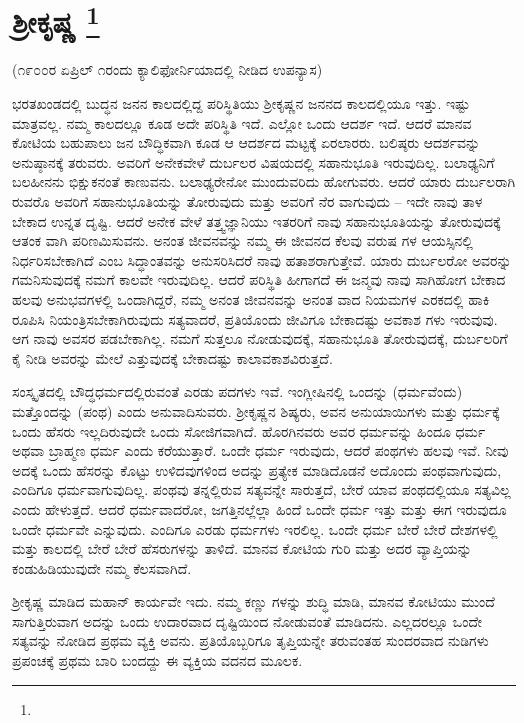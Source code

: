 
\chapter[ಶ‍್ರೀಕೃಷ್ಣ ]{ಶ‍್ರೀಕೃಷ್ಣ \protect\footnote{}}

\centerline{(೧೯೦೦ರ ಏಪ್ರಿಲ್​ ೧ರಂದು ಕ್ಯಾಲಿಫೋರ್ನಿಯಾದಲ್ಲಿ ನೀಡಿದ ಉಪನ್ಯಾಸ)}

ಭರತಖಂಡದಲ್ಲಿ ಬುದ್ಧನ ಜನನ ಕಾಲದಲ್ಲಿದ್ದ ಪರಿಸ್ಥಿತಿಯು ಶ‍್ರೀಕೃಷ್ಣನ ಜನನದ ಕಾಲದಲ್ಲಿಯೂ ಇತ್ತು. ಇಷ್ಟು ಮಾತ್ರವಲ್ಲ. ನಮ್ಮ ಕಾಲದಲ್ಲೂ ಕೂಡ ಅದೇ ಪರಿಸ್ಥಿತಿ ಇದೆ. ಎಲ್ಲೋ ಒಂದು ಆದರ್ಶ ಇದೆ. ಆದರೆ ಮಾನವ ಕೋಟಿಯ ಬಹುಪಾಲು ಜನ ಬೌದ್ಧಿಕವಾಗಿ ಕೂಡ ಆ ಆದರ್ಶದ ಮಟ್ಟಕ್ಕೆ ಏರಲಾರರು. ಬಲಿಷ್ಠರು ಆದರ್ಶವನ್ನು ಅನುಷ್ಠಾನಕ್ಕೆ ತರುವರು. ಅವರಿಗೆ ಅನೇಕವೇಳೆ ದುರ್ಬಲರ ವಿಷಯದಲ್ಲಿ ಸಹಾನುಭೂತಿ ಇರುವುದಿಲ್ಲ. ಬಲಾಢ್ಯನಿಗೆ ಬಲಹೀನನು ಭಿಕ್ಷುಕನಂತೆ ಕಾಣುವನು. ಬಲಾಢ್ಯರೇನೋ ಮುಂದುವರಿದು ಹೋಗುವರು. ಆದರೆ ಯಾರು ದುರ್ಬಲರಾಗಿ ರುವರೊ ಅವರಿಗೆ ಸಹಾನುಭೂತಿಯನ್ನು ತೋರುವುದು ಮತ್ತು ಅವರಿಗೆ ನೆರ ವಾಗುವುದು – ಇದೇ ನಾವು ತಾಳ ಬೇಕಾದ ಉನ್ನತ ದೃಷ್ಟಿ. ಆದರೆ ಅನೇಕ ವೇಳೆ ತತ್ತ್ವಜ್ಞಾನಿಯು ಇತರರಿಗೆ ನಾವು ಸಹಾನುಭೂತಿಯನ್ನು ತೋರುವುದಕ್ಕೆ ಆತಂಕ ವಾಗಿ ಪರಿಣಮಿಸುವನು. ಅನಂತ ಜೀವನವನ್ನು ನಮ್ಮ ಈ ಜೀವನದ ಕೆಲವು ವರುಷ ಗಳ ಆಯಸ್ಸಿನಲ್ಲಿ ನಿರ್ಧರಿಸಬೇಕಾಗಿದೆ ಎಂಬ ಸಿದ್ಧಾಂತವನ್ನು ಅನುಸರಿಸಿದರೆ ನಾವು ಹತಾಶರಾಗುತ್ತೇವೆ. ಯಾರು ದುರ್ಬಲರೋ ಅವರನ್ನು ಗಮನಿಸುವುದಕ್ಕೆ ನಮಗೆ ಕಾಲವೇ ಇರುವುದಿಲ್ಲ. ಆದರೆ ಪರಿಸ್ಥಿತಿ ಹೀಗಾಗದೆ ಈ ಜನ್ಮವು ನಾವು ಸಾಗಿಹೋಗ ಬೇಕಾದ ಹಲವು ಅನುಭವಗಳಲ್ಲಿ ಒಂದಾಗಿದ್ದರೆ, ನಮ್ಮ ಅನಂತ ಜೀವನವನ್ನು ಅನಂತ ವಾದ ನಿಯಮಗಳ ಎರಕದಲ್ಲಿ ಹಾಕಿ ರೂಪಿಸಿ ನಿಯಂತ್ರಿಸಬೇಕಾಗಿರುವುದು ಸತ್ಯವಾದರೆ, ಪ್ರತಿಯೊಂದು ಜೀವಿಗೂ ಬೇಕಾದಷ್ಟು ಅವಕಾಶ ಗಳು ಇರುವುವು. ಆಗ ನಾವು ಅವಸರ ಪಡಬೇಕಾಗಿಲ್ಲ. ನಮಗೆ ಸುತ್ತಲೂ ನೋಡುವುದಕ್ಕೆ, ಸಹಾನುಭೂತಿ ತೋರುವುದಕ್ಕೆ, ದುರ್ಬಲರಿಗೆ ಕೈ ನೀಡಿ ಅವರನ್ನು ಮೇಲೆ ಎತ್ತುವುದಕ್ಕೆ ಬೇಕಾದಷ್ಟು ಕಾಲಾವಕಾಶವಿರುತ್ತದೆ.

ಸಂಸ್ಕೃತದಲ್ಲಿ ಬೌದ್ಧಧರ್ಮದಲ್ಲಿರುವಂತೆ ಎರಡು ಪದಗಳು ಇವೆ. ಇಂಗ್ಲೀಷಿನಲ್ಲಿ ಒಂದನ್ನು  (ಧರ್ಮವೆಂದು) ಮತ್ತೊಂದನ್ನು  (ಪಂಥ) ಎಂದು ಅನುವಾದಿಸುವರು. ಶ‍್ರೀಕೃಷ್ಣನ ಶಿಷ್ಯರು, ಅವನ ಅನುಯಾಯಿಗಳು ಮತ್ತು ಧರ್ಮಕ್ಕೆ ಒಂದು ಹೆಸರು ಇಲ್ಲದಿರುವುದೇ ಒಂದು ಸೋಜಿಗವಾಗಿದೆ. ಹೊರಗಿನವರು ಅವರ ಧರ್ಮವನ್ನು ಹಿಂದೂ ಧರ್ಮ ಅಥವಾ ಬ್ರಾಹ್ಮಣ ಧರ್ಮ ಎಂದು ಕರೆಯುತ್ತಾರೆ. ಒಂದೇ ಧರ್ಮ ಇರುವುದು, ಆದರೆ ಪಂಥಗಳು ಹಲವು ಇವೆ. ನೀವು ಅದಕ್ಕೆ ಒಂದು ಹೆಸರನ್ನು ಕೊಟ್ಟು ಉಳಿದವುಗಳಿಂದ ಅದನ್ನು ಪ್ರತ್ಯೇಕ ಮಾಡಿದೊಡನೆ ಅದೊಂದು ಪಂಥವಾಗುವುದು, ಎಂದಿಗೂ ಧರ್ಮವಾಗುವುದಿಲ್ಲ. ಪಂಥವು ತನ್ನಲ್ಲಿರುವ ಸತ್ಯವನ್ನೇ ಸಾರುತ್ತದೆ, ಬೇರೆ ಯಾವ ಪಂಥದಲ್ಲಿಯೂ ಸತ್ಯವಿಲ್ಲ ಎಂದು ಹೇಳುತ್ತದೆ. ಆದರೆ ಧರ್ಮವಾದರೋ, ಜಗತ್ತಿನಲ್ಲೆಲ್ಲಾ ಹಿಂದೆ ಒಂದೇ ಧರ್ಮ ಇತ್ತು ಮತ್ತು ಈಗ ಇರುವುದೂ ಒಂದೇ ಧರ್ಮವೇ ಎನ್ನುವುದು. ಎಂದಿಗೂ ಎರಡು ಧರ್ಮಗಳು ಇರಲಿಲ್ಲ. ಒಂದೇ ಧರ್ಮ ಬೇರೆ ಬೇರೆ ದೇಶಗಳಲ್ಲಿ ಮತ್ತು ಕಾಲದಲ್ಲಿ ಬೇರೆ ಬೇರೆ ಹೆಸರುಗಳನ್ನು ತಾಳಿದೆ. ಮಾನವ ಕೋಟಿಯ ಗುರಿ ಮತ್ತು ಅದರ ವ್ಯಾಪ್ತಿಯನ್ನು ಕಂಡುಹಿಡಿಯುವುದೇ ನಮ್ಮ ಕೆಲಸವಾಗಿದೆ.

ಶ‍್ರೀಕೃಷ್ಣ ಮಾಡಿದ ಮಹಾನ್​ ಕಾರ್ಯವೇ ಇದು. ನಮ್ಮ ಕಣ್ಣು ಗಳನ್ನು ಶುದ್ಧಿ ಮಾಡಿ, ಮಾನವ ಕೋಟಿಯು ಮುಂದೆ ಸಾಗುತ್ತಿರುವಾಗ ಅದನ್ನು ಒಂದು ಉದಾರವಾದ ದೃಷ್ಟಿಯಿಂದ ನೋಡುವಂತೆ ಮಾಡಿದನು. ಎಲ್ಲದರಲ್ಲೂ ಒಂದೇ ಸತ್ಯವನ್ನು ನೋಡಿದ ಪ್ರಥಮ ವ್ಯಕ್ತಿ ಅವನು. ಪ್ರತಿಯೊಬ್ಬರಿಗೂ ತೃಪ್ತಿಯನ್ನೇ ತರುವಂತಹ ಸುಂದರವಾದ ನುಡಿಗಳು ಪ್ರಪಂಚಕ್ಕೆ ಪ್ರಥಮ ಬಾರಿ ಬಂದದ್ದು ಈ ವ್ಯಕ್ತಿಯ ವದನದ ಮೂಲಕ.

